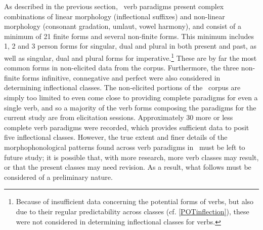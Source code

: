 As described in the previous section, \PS\ verb paradigms present complex combinations of linear morphology (inflectional suffixes) and non-linear morphology (consonant gradation, umlaut, vowel harmony), and consist of a minimum of 21 finite forms and several non-finite forms. This minimum includes 1, 2 and 3 person forms for singular, dual and plural in both present and past, as well as singular, dual and plural forms for imperative.\footnote{Because of insufficient data concerning the potential forms of verbs, but also due to their regular predictability across classes (cf. \SEC\ref{POTinflection}), these were not considered in determining inflectional classes for verbs.} 
These are by far the most common forms in non-elicited data from the corpus. Furthermore, the three non-finite forms infinitive, connegative and perfect were also considered in determining inflectional classes. %
The non-elicited portions of the \PSDP\ corpus are simply too limited to even come close to providing complete paradigms for even a single verb, and so a majority of the verb forms composing the paradigms for the current study are from elicitation sessions. Approximately 30 more or less complete verb paradigms were recorded, which provides sufficient data to posit five inflectional classes. However, the true extent and finer details of the morphophonological patterns found across verb paradigms in \PS\ must be left to future study; it is possible that, with more research, more verb classes may result, or that the present classes may need revision. As a result, what follows must be considered of a preliminary nature. 


